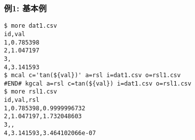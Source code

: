 \subsubsection*{例1: 基本例}



\begin{Verbatim}[baselinestretch=0.7,frame=single]
$ more dat1.csv
id,val
1,0.785398
2,1.047197
3,
4,3.141593
$ mcal c='tan(${val})' a=rsl i=dat1.csv o=rsl1.csv
#END# kgcal a=rsl c=tan(${val}) i=dat1.csv o=rsl1.csv
$ more rsl1.csv
id,val,rsl
1,0.785398,0.9999996732
2,1.047197,1.732048603
3,,
4,3.141593,3.464102066e-07
\end{Verbatim}
